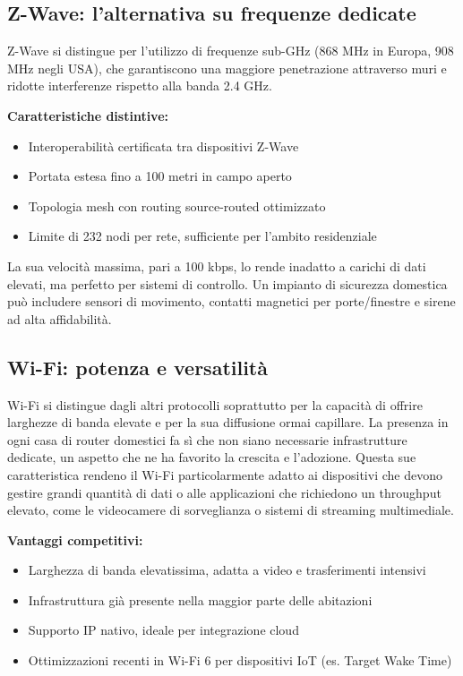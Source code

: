 \subsection{Z-Wave: l'alternativa su frequenze dedicate}

Z-Wave si distingue per l’utilizzo di frequenze sub-GHz (868 MHz in Europa, 908 MHz negli USA), che garantiscono una maggiore penetrazione attraverso muri e ridotte interferenze rispetto alla banda 2.4 GHz.

\textbf{Caratteristiche distintive:}
\begin{itemize}
    \item Interoperabilità certificata tra dispositivi Z-Wave
    \item Portata estesa fino a 100 metri in campo aperto
    \item Topologia mesh con routing source-routed ottimizzato
    \item Limite di 232 nodi per rete, sufficiente per l’ambito residenziale
\end{itemize}

La sua velocità massima, pari a 100 kbps, lo rende inadatto a carichi di dati elevati, ma perfetto per sistemi di controllo. Un impianto di sicurezza domestica può includere sensori di movimento, contatti magnetici per porte/finestre e sirene ad alta affidabilità.

\subsection{Wi-Fi: potenza e versatilità}

Wi-Fi si distingue dagli altri protocolli soprattutto per la capacità di offrire larghezze di banda elevate e per la sua diffusione ormai capillare. La presenza in ogni casa di router domestici fa sì che non siano necessarie infrastrutture dedicate, un aspetto che ne ha favorito la crescita e l’adozione. Questa sue caratteristica rendeno il Wi-Fi particolarmente adatto ai dispositivi che devono gestire grandi quantità di dati o alle applicazioni che richiedono un throughput elevato, come le videocamere di sorveglianza o sistemi di streaming multimediale.


\textbf{Vantaggi competitivi:}
\begin{itemize}
    \item Larghezza di banda elevatissima, adatta a video e trasferimenti intensivi
    \item Infrastruttura già presente nella maggior parte delle abitazioni
    \item Supporto IP nativo, ideale per integrazione cloud
    \item Ottimizzazioni recenti in Wi-Fi 6 per dispositivi IoT (es. Target Wake Time)
\end{itemize}

